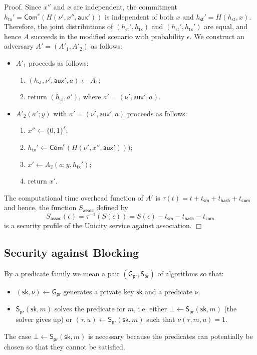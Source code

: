\documentclass{article}
\newenvironment{proof}{\textsf{Proof}.}{\hfill$\Box$}
\newcommand{\prikey}[0]{\mathsf{sk}}
\newcommand{\commitc}[0]{\mathsf{Com}^{c}}
\newcommand{\sthash}[0]{h_\mathsf{st}}
\newcommand{\txhash}[0]{h_\mathsf{tx}}
\newcommand{\auxd}[0]{\mathsf{aux}}
\newcommand{\predi}[0]{\nu}
\newcommand{\systime}[0]{\tau}
\newcommand{\prgen}[0]{\mathsf{G}_\mathsf{pr}}
\newcommand{\prsig}[0]{\mathsf{S}_\mathsf{pr}}
\begin{document}
\begin{proof}
Since $x''$ and $x$ are independent, the commitment $\txhash'=\commitc(H(\predi',x'',\auxd'))$ is independent of both $x$ and $\sthash'=H(\sthash,x)$. Therefore, the joint distributions of $(\sthash',\txhash)$ and $(\sthash',\txhash')$ are equal, and hence $A$ succeeds in the modified scenario with probability $\epsilon$. We construct an adversary $A'=(A'_1,A'_2)$ as follows:
\begin{itemize}
\item $A'_1$ proceeds as follows:
\begin{enumerate}
\item $(\sthash, \predi', \auxd', a)\gets A_1$;
\item return $(\sthash, a')$, where $a'=(\predi', \auxd', a)$.
\end{enumerate}
\item $A'_2(a';y)$ with $a'=(\predi', \auxd', a)$ proceeds as follows:
\begin{enumerate}
\item $x''\gets \{0,1\}^\ell$;
\item $\txhash'\gets\commitc(H(\predi',x'',\auxd')))$;
\item $x'\gets A_2(a; y,\txhash')$;
\item return $x'$.
\end{enumerate}
\end{itemize}

\noindent The computational time overhead function of $A'$ is $\tau(t) = t + t_\mathsf{sm} + t_\mathsf{hash} + t_\mathsf{com}$ and hence, the function $S_\mathsf{assoc}$ defined by
\[
S_\mathsf{assoc}(\epsilon) = \tau^{-1}(S(\epsilon)) = S(\epsilon) - t_\mathsf{sm} - t_\mathsf{hash} - t_\mathsf{com}
\]
is a security profile of the Unicity service against association.
\end{proof}

\subsection{Security against Blocking}

By a predicate family we mean a pair $(\prgen,\prsig)$ of algorithms so that:
\begin{itemize}
\item $(\prikey,\predi)\gets\prgen$ generates a private key $\prikey$ and a predicate $\predi$.
\item $\prsig(\prikey,m)$ solves the predicate for $m$, i.e. either $\bot\gets\prsig(\prikey,m)$ (the solver gives up) or $(\systime,u)\gets\prsig(\prikey,m)$ such that $\predi(\systime,m,u)=1$.
\end{itemize}
The case $\bot\gets\prsig(\prikey,m)$ is necessary because the predicates can potentially be chosen so that they cannot be satisfied.
\end{document}
